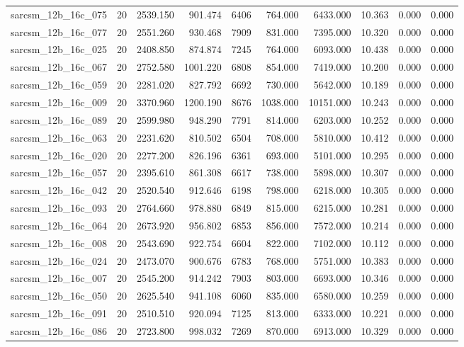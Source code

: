\begin{tabular}{lrrrrrrrrr}
sarcsm\_12b\_16c\_075 & 20 & 2539.150 & 901.474 & 6406 & 764.000 & 6433.000 & 10.363 & 0.000 & 0.000 \\
sarcsm\_12b\_16c\_077 & 20 & 2551.260 & 930.468 & 7909 & 831.000 & 7395.000 & 10.320 & 0.000 & 0.000 \\
sarcsm\_12b\_16c\_025 & 20 & 2408.850 & 874.874 & 7245 & 764.000 & 6093.000 & 10.438 & 0.000 & 0.000 \\
sarcsm\_12b\_16c\_067 & 20 & 2752.580 & 1001.220 & 6808 & 854.000 & 7419.000 & 10.200 & 0.000 & 0.000 \\
sarcsm\_12b\_16c\_059 & 20 & 2281.020 & 827.792 & 6692 & 730.000 & 5642.000 & 10.189 & 0.000 & 0.000 \\
sarcsm\_12b\_16c\_009 & 20 & 3370.960 & 1200.190 & 8676 & 1038.000 & 10151.000 & 10.243 & 0.000 & 0.000 \\
sarcsm\_12b\_16c\_089 & 20 & 2599.980 & 948.290 & 7791 & 814.000 & 6203.000 & 10.252 & 0.000 & 0.000 \\
sarcsm\_12b\_16c\_063 & 20 & 2231.620 & 810.502 & 6504 & 708.000 & 5810.000 & 10.412 & 0.000 & 0.000 \\
sarcsm\_12b\_16c\_020 & 20 & 2277.200 & 826.196 & 6361 & 693.000 & 5101.000 & 10.295 & 0.000 & 0.000 \\
sarcsm\_12b\_16c\_057 & 20 & 2395.610 & 861.308 & 6617 & 738.000 & 5898.000 & 10.307 & 0.000 & 0.000 \\
sarcsm\_12b\_16c\_042 & 20 & 2520.540 & 912.646 & 6198 & 798.000 & 6218.000 & 10.305 & 0.000 & 0.000 \\
sarcsm\_12b\_16c\_093 & 20 & 2764.660 & 978.880 & 6849 & 815.000 & 6215.000 & 10.281 & 0.000 & 0.000 \\
sarcsm\_12b\_16c\_064 & 20 & 2673.920 & 956.802 & 6853 & 856.000 & 7572.000 & 10.214 & 0.000 & 0.000 \\
sarcsm\_12b\_16c\_008 & 20 & 2543.690 & 922.754 & 6604 & 822.000 & 7102.000 & 10.112 & 0.000 & 0.000 \\
sarcsm\_12b\_16c\_024 & 20 & 2473.070 & 900.676 & 6783 & 768.000 & 5751.000 & 10.383 & 0.000 & 0.000 \\
sarcsm\_12b\_16c\_007 & 20 & 2545.200 & 914.242 & 7903 & 803.000 & 6693.000 & 10.346 & 0.000 & 0.000 \\
sarcsm\_12b\_16c\_050 & 20 & 2625.540 & 941.108 & 6060 & 835.000 & 6580.000 & 10.259 & 0.000 & 0.000 \\
sarcsm\_12b\_16c\_091 & 20 & 2510.510 & 920.094 & 7125 & 813.000 & 6333.000 & 10.221 & 0.000 & 0.000 \\
sarcsm\_12b\_16c\_086 & 20 & 2723.800 & 998.032 & 7269 & 870.000 & 6913.000 & 10.329 & 0.000 & 0.000 \\

\end{tabular}
